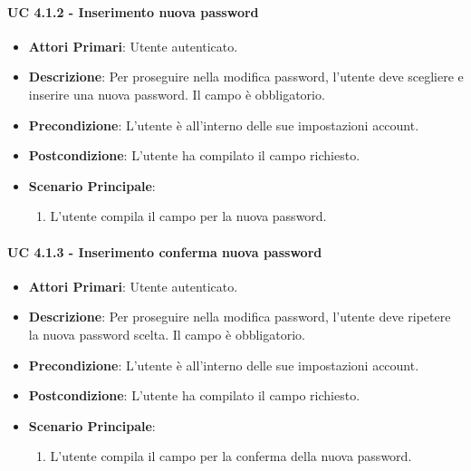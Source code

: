 				\paragraph{UC 4.1.2 - Inserimento nuova password}
				\begin{itemize}
					\item \textbf{Attori Primari}: Utente autenticato.
					\item \textbf{Descrizione}: Per proseguire nella modifica password, l'utente deve scegliere e inserire una nuova password. Il campo è obbligatorio.
					\item \textbf{Precondizione}: L'utente è all'interno delle sue impostazioni account.
					\item \textbf{Postcondizione}: L'utente ha compilato il campo richiesto.
					\item \textbf{Scenario Principale}:
					\begin{enumerate}
						\item L'utente compila il campo per la nuova password.
					\end{enumerate}
				\end{itemize}

				\paragraph{UC 4.1.3 - Inserimento conferma nuova password}
				\begin{itemize}
					\item \textbf{Attori Primari}: Utente autenticato.
					\item \textbf{Descrizione}: Per proseguire nella modifica password, l'utente deve ripetere la nuova password scelta. Il campo è obbligatorio.
					\item \textbf{Precondizione}: L'utente è all'interno delle sue impostazioni account.
					\item \textbf{Postcondizione}: L'utente ha compilato il campo richiesto.
					\item \textbf{Scenario Principale}:
					\begin{enumerate}
						\item L'utente compila il campo per la conferma della nuova password.
					\end{enumerate}
				\end{itemize}

